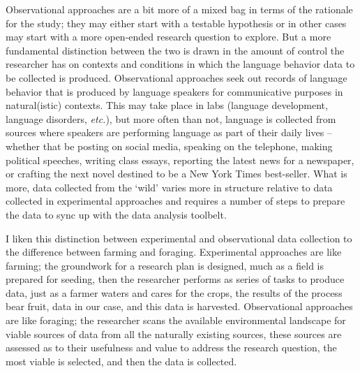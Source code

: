 \documentclass[
  letterpaper,
]{scrbook}
\begin{document}
Observational approaches are a bit more of a mixed bag in terms of the
rationale for the study; they may either start with a testable
hypothesis or in other cases may start with a more open-ended research
question to explore. But a more fundamental distinction between the two
is drawn in the amount of control the researcher has on contexts and
conditions in which the language behavior data to be collected is
produced. Observational approaches seek out records of language behavior
that is produced by language speakers for communicative purposes in
natural(istic) contexts. This may take place in labs (language
development, language disorders, \emph{etc.}), but more often than not,
language is collected from sources where speakers are performing
language as part of their daily lives --whether that be posting on
social media, speaking on the telephone, making political speeches,
writing class essays, reporting the latest news for a newspaper, or
crafting the next novel destined to be a New York Times best-seller.
What is more, data collected from the `wild' varies more in structure
relative to data collected in experimental approaches and requires a
number of steps to prepare the data to sync up with the data analysis
toolbelt.

I liken this distinction between experimental and observational data
collection to the difference between farming and foraging. Experimental
approaches are like farming; the groundwork for a research plan is
designed, much as a field is prepared for seeding, then the researcher
performs as series of tasks to produce data, just as a farmer waters and
cares for the crops, the results of the process bear fruit, data in our
case, and this data is harvested. Observational approaches are like
foraging; the researcher scans the available environmental landscape for
viable sources of data from all the naturally existing sources, these
sources are assessed as to their usefulness and value to address the
research question, the most viable is selected, and then the data is
collected.
\end{document}

